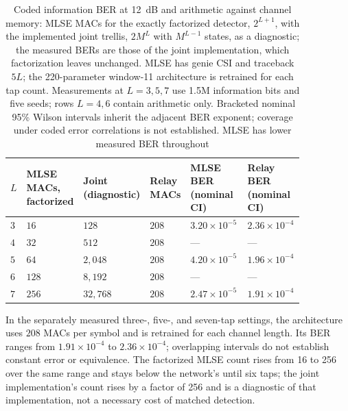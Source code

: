 \begin{table}[htbp]
\centering
\caption[Cost and accuracy against channel memory]{Coded information BER at 12~dB and arithmetic against channel memory: MLSE MACs for the exactly factorized detector, $2^{L+1}$, with the implemented joint trellis, $2M^{L}$ with $M^{L-1}$ states, as a diagnostic; the measured BERs are those of the joint implementation, which factorization leaves unchanged. MLSE has genie CSI and traceback $5L$; the 220-parameter window-11 architecture is retrained for each tap count. Measurements at $L=3,5,7$ use 1.5M information bits and five seeds; rows $L=4,6$ contain arithmetic only. Bracketed nominal 95\% Wilson intervals inherit the adjacent BER exponent; coverage under coded error correlations is not established. MLSE has lower measured BER throughout}\label{tbl:joint-memory}
\begin{tabular}{@{}p{0.04\linewidth}p{0.12\linewidth}p{0.14\linewidth}p{0.10\linewidth}p{0.23\linewidth}p{0.22\linewidth}@{}}
\toprule
$L$ & MLSE MACs, factorized & Joint (diagnostic) & Relay MACs & MLSE BER (nominal CI) & Relay BER (nominal CI) \\
\midrule
$3$ & $16$      & $128$      & $208$ & $3.20\times10^{-5}$ \newline [2.41, 4.24] & $2.36\times10^{-4}$ \newline [2.13, 2.62] \\
$4$ & $32$      & $512$      & $208$ & ---                                     & ---                                     \\
$5$ & $64$      & $2{,}048$  & $208$ & $4.20\times10^{-5}$ \newline [3.28, 5.37] & $1.96\times10^{-4}$ \newline [1.75, 2.20] \\
$6$ & $128$     & $8{,}192$  & $208$ & ---                                     & ---                                     \\
$7$ & $256$     & $32{,}768$ & $208$ & $2.47\times10^{-5}$ \newline [1.79, 3.40] & $1.91\times10^{-4}$ \newline [1.70, 2.14] \\
\bottomrule
\end{tabular}
\end{table}

In the separately measured three-, five-, and seven-tap settings, the architecture uses $208$ MACs per symbol and is retrained for each channel length. Its BER ranges from $1.91\times10^{-4}$ to $2.36\times10^{-4}$; overlapping intervals do not establish constant error or equivalence. The factorized MLSE count rises from 16 to 256 over the same range and stays below the network's until six taps; the joint implementation's count rises by a factor of 256 and is a diagnostic of that implementation, not a necessary cost of matched detection.

